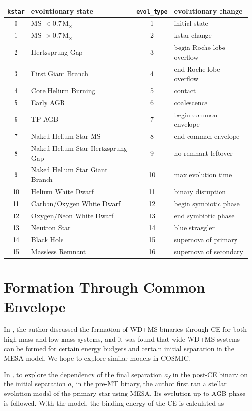 \documentclass[12pt]{article}
\newcommand{\Msun}{\,\mathrm{M_{\odot}}}
\begin{document}
\begin{tabular}{|cl|cl|}
  \hline
  \verb|kstar| & \textbf{evolutionary state} & \verb|evol_type| & \textbf{evolutionary change} \\
  \hline
  0 & MS $<0.7 \Msun$ & 1 & initial state \\
  1 & MS $>0.7 \Msun$ & 2 & kstar change \\
  2 & Hertzsprung Gap & 3 & begin Roche lobe overflow\\
  3 & First Giant Branch & 4 & end Roche lobe overflow\\
  4 & Core Helium Burning & 5 & contact \\
  5 & Early AGB & 6 & coalescence \\
  6 & TP-AGB & 7 & begin common envelope \\
  7 & Naked Helium Star MS & 8 & end common envelope \\
  8 & Naked Helium Star Hertzsprung Gap & 9 & no remnant leftover \\
  9 & Naked Helium Star Giant Branch & 10 & max evolution time \\
  10 & Helium White Dwarf & 11 & binary disruption \\
  11 & Carbon/Oxygen White Dwarf & 12 & begin symbiotic phase \\
  12 & Oxygen/Neon White Dwarf & 13 & end symbiotic phase \\
  13 & Neutron Star & 14 & blue straggler \\
  14 & Black Hole & 15 & supernova of primary \\
  15 & Massless Remnant & 16 & supernova of secondary \\
  \hline
\end{tabular}

\section{Formation Through Common Envelope} \label{sec:ce}
In \cite{yamaguchi_hi, yamaguchi_lo}, the author discussed the formation of WD+MS binaries through CE for both high-mass and low-mass systems, and it was found that wide WD+MS systems can be formed for certain energy budgets and certain initial separation in the MESA model. We hope to explore similar models in COSMIC.

In \cite{yamaguchi_hi, yamaguchi_lo}, to explore the dependency of the final separation $a_f$ in the post-CE binary on the initial separation $a_i$ in the pre-MT binary, the author first ran a stellar evolution model of the primary star using MESA. Its evolution up to AGB phase is followed. With the model, the binding energy of the CE is calculated as
\end{document}
